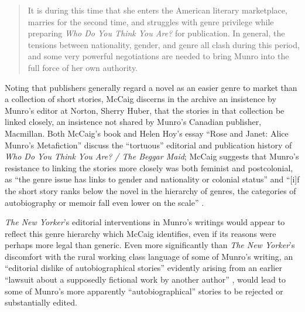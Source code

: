 \begin{paper}
\begin{quote}
It is during this time that she enters the American literary marketplace, marries for
the second time, and struggles with genre privilege while preparing \emph{Who Do You Think You Are?} for publication. In general, the tensions between nationality, gender, and genre all clash during this period, and some very powerful negotiations are needed to bring Munro into the full force of her own authority. 

\begin{flushright}
    \parencite[13--14]{mccaig_reading_2002}
\end{flushright}
\end{quote}

Noting that publishers generally regard a novel as an easier genre to
market than a collection of short stories, McCaig discerns in the
archive an insistence by Munro's editor at Norton, Sherry Huber, that
the stories in that collection be linked closely, an insistence not
shared by Munro's Canadian publisher, Macmillan. Both McCaig's book and
Helen Hoy's essay ``Rose and Janet: Alice Munro's Metafiction'' discuss
the ``tortuous'' \citep[69]{hoy_rose_1989} editorial and publication history of \emph{Who
Do You Think You Are? / The Beggar Maid}; McCaig suggests that Munro's
resistance to linking the stories more closely was both feminist and
postcolonial, as ``the genre issue has links to gender and nationality
or colonial status'' and ``{[}i{]}f the short story ranks below the
novel in the hierarchy of genres, the categories of autobiography or
memoir fall even lower on the scale'' \citep[122]{mccaig_reading_2002}.

\emph{The New Yorker}'s editorial interventions in Munro's writings
would appear to reflect this genre hierarchy which McCaig identifies,
even if its reasons were perhaps more legal than generic. Even more
significantly than \emph{The New Yorker}'s discomfort with the rural
working class language of some of Munro's writing, an ``editorial
dislike of autobiographical stories'' evidently arising from an earlier
``lawsuit about a supposedly fictional work by another author'' \citep[207]{beran_luxury_1998},
would lead to some of Munro's more apparently ``autobiographical''
stories to be rejected or substantially edited. 


\end{paper}

